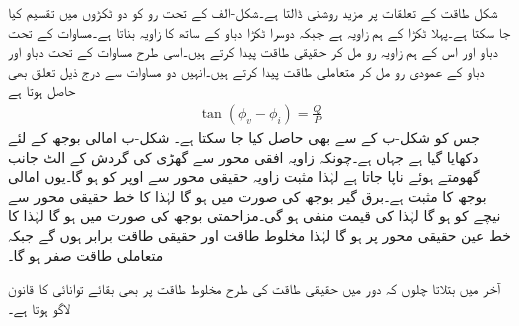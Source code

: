 شکل  طاقت کے تعلقات پر  مزید روشنی ڈالتا ہے۔شکل-الف کے تحت رو کو دو ٹکڑوں میں تقسیم کیا جا سکتا ہے۔پہلا ٹکڑا  کے ہم زاویہ ہے جبکہ دوسرا ٹکڑا دباو کے ساتھ  کا زاویہ بناتا ہے۔مساوات  کے تحت دباو اور اس کے ہم زاویہ رو مل کر حقیقی طاقت  پیدا کرتے ہیں۔اسی طرح مساوات  کے تحت دباو اور دباو کے عمودی رو مل کر متعاملی طاقت  پیدا کرتے ہیں۔انہیں دو مساوات سے درج ذیل تعلق بھی حاصل ہوتا ہے
\begin{align}
\tan(\phi_v-\phi_i)=\frac{Q}{P}
\end{align}
جس کو شکل-ب کے  سے بھی حاصل کیا جا سکتا ہے۔
 شکل-ب امالی بوجھ کے لئے دکھایا گیا ہے جہاں  ہے۔چونکہ زاویہ افقی محور سے گھڑی کی گردش کے الٹ جانب گھومتے ہوئے ناپا جاتا ہے لہٰذا مثبت زاویہ حقیقی محور سے اوپر کو ہو گا۔یوں امالی بوجھ کا  مثبت ہے۔برق گیر بوجھ کی صورت میں  ہو گا لہٰذا  کا خط حقیقی محور سے نیچے کو ہو گا لہٰذا  کی قیمت منفی ہو گی۔مزاحمتی بوجھ کی صورت میں  ہو گا لہٰذا  کا خط عین حقیقی محور پر ہو گا لہٰذا مخلوط طاقت اور حقیقی طاقت برابر ہوں گے جبکہ متعاملی طاقت صفر ہو گا۔

آخر میں بتلاتا چلوں کہ دور میں حقیقی طاقت کی طرح مخلوط طاقت پر بھی بقائے توانائی کا قانون لاگو ہوتا ہے۔

